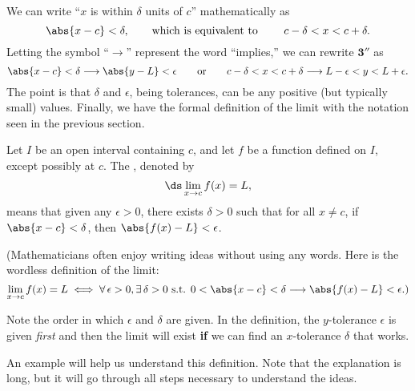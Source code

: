 We can write ``$x$ is within $\delta$ units of $c$'' mathematically as
\[\abs{x-c} < \delta, \qquad \text{which is equivalent to }\qquad c-\delta < x < c+\delta.\]
Letting the symbol ``$\longrightarrow$'' represent the word ``implies,'' we can rewrite $\textbf{3}''$ as 
\[
\abs{x - c} < \delta \longrightarrow  \abs{y - L} < \epsilon 
\qquad \textrm{or} \qquad c - \delta < x < c + \delta \longrightarrow L - \epsilon < y < L + \epsilon.
\]
The point is that $\delta$ and $\epsilon$, being tolerances, can be any positive (but typically small) values.  Finally, we have the formal definition of the limit with the notation  seen in the previous section.

{Let $I$ be an open interval containing $c$, and let $f$ be a function defined on $I$, except possibly at $c$. The , denoted by
\[\ds\lim_{x\rightarrow c} f(x) = L,\]
means that given any $\epsilon > 0$, there exists $\delta > 0$ such that for all $x\neq c$,  
if  $\abs{x - c} < \delta$, then $\abs{f(x) - L} < \epsilon$.
}

(Mathematicians often enjoy writing ideas without using any words. Here is the wordless definition of the limit:
\[
\lim_{x\to c} f(x) = L \iff
\forall \, \epsilon > 0, \exists \, \delta > 0 \text{ s.t. }
0<\abs{x - c} < \delta \longrightarrow \abs{f(x) - L} < \epsilon\text{.)}
\]

Note the order in which $\epsilon$ and $\delta$ are given.  In the definition, the $y$-tolerance $\epsilon$ is given \textit{first} and then the limit will exist \textbf{if} we can find an $x$-tolerance $\delta$ that works.


An example will help us understand this definition.  Note that the explanation is long, but it will go through all steps necessary to understand the ideas.

